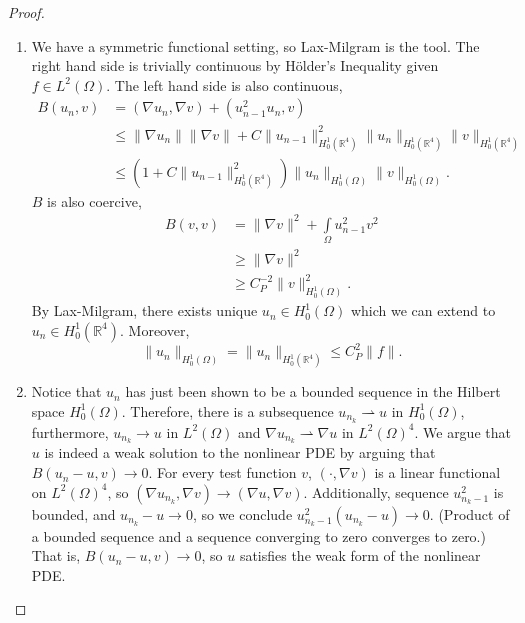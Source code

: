 \documentclass[letterpaper,twoside,11pt]{article}
\theoremstyle{mystyle}
\newcommand{\R}{{\mathbb R}}
\newcommand{\cbk}{\color{black}}
\begin{document}
\begin{proof}
\begin{enumerate}
    \item We have a symmetric functional setting, so Lax-Milgram is the tool. The right hand side is trivially continuous by H\"older's Inequality given $f \in L^2 (\Omega)$. The left hand side is also continuous, 
    \begin{align*}
      B(u_n,v) &= \left( \nabla u_n, \nabla v \right) + \left( u_{n-1}^2 u_n ,v \right)\\
      &\leq \|\nabla u_n\| \|\nabla v\| + C\|u_{n-1}\|^2_{H_0^1(\R^4)} \|u_n \|_{H_0^1(\R^4)} \|v\|_{H_0^1(\R^4)} \\
      &\leq \left( 1+C\|u_{n-1}\|^2_{H_0^1(\R^4)} \right)\|u_n \|_{H_0^1(\Omega)} \|v\|_{H_0^1(\Omega)}.
    \end{align*}
    \(B\) is also coercive, 
    \begin{align*}
      B\left( v, v \right) &= \|\nabla v\|^2 + \int\limits_\Omega u_{n-1}^2 v^2 \\ 
      &\geq \|\nabla v\|^2 \\
      &\geq C_P^{-2} \|v\|_{H^1_0(\Omega)}^2.
    \end{align*}
    By Lax-Milgram, there exists unique $u_n \in H_0^1 \left( \Omega \right)$ which we can extend to $u_n \in H_0^1 \left( \R^4 \right)$. Moreover, 
    \[\|u_n\|_{H^1_0 \left( \Omega \right)} = \|u_n\|_{H^1_0 \left( \R^4 \right)} \leq C_P^2 \|f\|.\] 
    \item Notice that $u_n$ has just been shown to be a bounded sequence in the Hilbert space $H_0^1 \left( \Omega \right)$. Therefore, there is a subsequence $u_{n_k} \rightharpoonup u$ in $H_0^1(\Omega)$, furthermore, $u_{n_k} \to u$ in $L^2 (\Omega)$ and $\nabla u_{n_k} \rightharpoonup \nabla u$ in $L^2 (\Omega)^{4}$. 
    We argue that $u$ is indeed a weak solution to the nonlinear PDE by arguing that $B(u_n-u, v) \to 0$. For every test function $v$, $\left( \cdot, \nabla v \right)$ is a linear functional on $L^2(\Omega)^4$, so $\left( \nabla u_{n_k}, \nabla v \right) \to \left( \nabla u, \nabla v \right)$. Additionally, sequence $u^2_{n_k-1}$ is bounded, and $u_{n_k}-u\to 0$, so we conclude $u^2_{n_k-1}(u_{n_k}-u)\to 0$. (Product of a bounded sequence and a sequence converging to zero converges to zero.) That is, $B(u_n-u,v) \to 0$, so $u$ satisfies the weak form of the nonlinear PDE. 
  \end{enumerate}
\end{proof}
\cbk 
\end{document}
